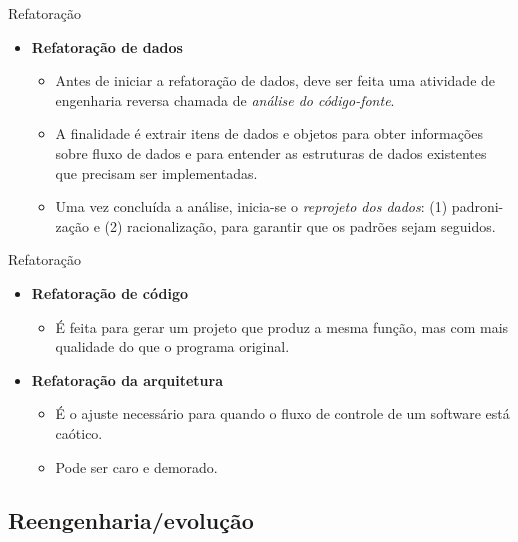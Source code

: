 \documentclass{beamer}
\begin{document}
\begin{frame}{Refatoração}
	\begin{itemize}
		\justifying
		\item \textbf{Refatoração de dados}
			\begin{itemize}
				\justifying
				\item Antes de iniciar a refatoração de dados, deve ser feita uma atividade de engenharia reversa chamada de \textit{análise do código-fonte}.
				\item A finalidade é extrair itens de dados e objetos para obter informações sobre fluxo de dados e para entender as estruturas de dados existentes que precisam ser implementadas.
				\item Uma vez concluída a análise, inicia-se o \textit{reprojeto dos dados}: (1) padroni-zação e (2) racionalização, para garantir que os padrões sejam seguidos.
			\end{itemize}
	\end{itemize}
\end{frame}

\begin{frame}{Refatoração}
	\begin{itemize}
		\justifying
		\item \textbf{Refatoração de código}
			\begin{itemize}
				\justifying
				\item É feita para gerar um projeto que produz a mesma função, mas com mais qualidade do que o programa original.
			\end{itemize}
		\item \textbf{Refatoração da arquitetura}
			\begin{itemize}
				\justifying
				\item É o ajuste necessário para quando o fluxo de controle de um software está caótico.
				\item Pode ser caro e demorado.
			\end{itemize}
	\end{itemize}
\end{frame}

\subsection{Reengenharia/evolução}
\end{document}

